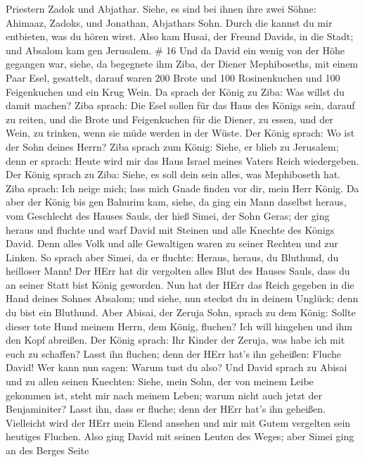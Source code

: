 Priestern Zadok und Abjathar.  Siehe, es sind bei ihnen
ihre zwei Söhne: Ahimaaz, Zadoks, und Jonathan, Abjathars Sohn. Durch
die kannst du mir entbieten, was du hören wirst.  Also kam
Husai, der Freund Davids, in die Stadt; und Absalom kam gen Jerusalem.
\# 16  Und da David ein wenig von der Höhe gegangen war,
siehe, da begegnete ihm Ziba, der Diener Mephiboseths, mit einem Paar
Esel, gesattelt, darauf waren 200 Brote und 100 Rosinenkuchen und 100
Feigenkuchen und ein Krug Wein.  Da sprach der König zu
Ziba: Was willst du damit machen? Ziba sprach: Die Esel sollen für das
Haus des Königs sein, darauf zu reiten, und die Brote und Feigenkuchen
für die Diener, zu essen, und der Wein, zu trinken, wenn sie müde werden
in der Wüste.  Der König sprach: Wo ist der Sohn deines
Herrn? Ziba sprach zum König: Siehe, er blieb zu Jerusalem; denn er
sprach: Heute wird mir das Haus Israel meines Vaters Reich wiedergeben.
 Der König sprach zu Ziba: Siehe, es soll dein sein alles,
was Mephiboseth hat. Ziba sprach: Ich neige mich; lass mich Gnade finden
vor dir, mein Herr König.  Da aber der König bis gen Bahurim
kam, siehe, da ging ein Mann daselbst heraus, vom Geschlecht des Hauses
Sauls, der hieß Simei, der Sohn Geras; der ging heraus und fluchte
 und warf David mit Steinen und alle Knechte des Königs
David. Denn alles Volk und alle Gewaltigen waren zu seiner Rechten und
zur Linken.  So sprach aber Simei, da er fluchte: Heraus,
heraus, du Bluthund, du heilloser Mann!  Der HErr hat dir
vergolten alles Blut des Hauses Sauls, dass du an seiner Statt bist
König geworden. Nun hat der HErr das Reich gegeben in die Hand deines
Sohnes Absalom; und siehe, nun steckst du in deinem Unglück; denn du
bist ein Bluthund.  Aber Abisai, der Zeruja Sohn, sprach zu
dem König: Sollte dieser tote Hund meinem Herrn, dem König, fluchen? Ich
will hingehen und ihm den Kopf abreißen.  Der König sprach:
Ihr Kinder der Zeruja, was habe ich mit euch zu schaffen? Lasst ihn
fluchen; denn der HErr hat's ihn geheißen: Fluche David! Wer kann nun
sagen: Warum tust du also?  Und David sprach zu Abisai und
zu allen seinen Knechten: Siehe, mein Sohn, der von meinem Leibe
gekommen ist, steht mir nach meinem Leben; warum nicht auch jetzt der
Benjaminiter? Lasst ihn, dass er fluche; denn der HErr hat's ihn
geheißen.  Vielleicht wird der HErr mein Elend ansehen und
mir mit Gutem vergelten sein heutiges Fluchen.  Also ging
David mit seinen Leuten des Weges; aber Simei ging an des Berges Seite
